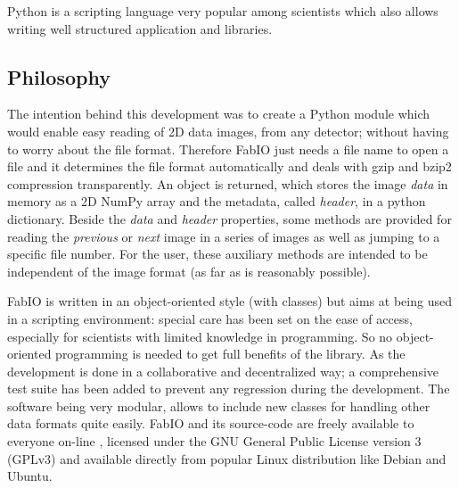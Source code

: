 \documentclass{iucr}
\begin{document}
Python \cite{python} is a scripting language very popular among scientists
which also allows writing well structured application and libraries.

\subsection{Philosophy}

The intention behind this development was to create a Python module which would
enable easy reading of 2D data images, from any detector; without having to
worry about the file format.
Therefore FabIO just needs a file name to open a file and it determines the
file format automatically and deals with gzip \cite{gzip} and bzip2
\cite{bzip2} compression transparently.
An object is returned, which stores the image
{\em data} in memory as a 2D NumPy array \cite{numpy} and the metadata,
called {\em header}, in a python dictionary. Beside the
{\em data} and {\em header} properties, some methods are provided for reading
the {\em previous} or {\em next} image in a series of images as well as jumping
to a specific file number.
For the user, these auxiliary methods are intended to be independent of
the image format (as far as is reasonably possible).

FabIO is written in an object-oriented style (with classes) but aims at being
used in a scripting environment: special care has been set on the ease of
access, especially for scientists with limited knowledge in programming. So
no object-oriented programming is needed to get full benefits of
the library. 
As the development is done in a collaborative and decentralized way; a
comprehensive test suite has been added to prevent any regression during the
development. The software being very modular, allows to include new
classes for handling other data formats quite easily.
FabIO and its source-code are freely available to everyone on-line \cite{fabio}, 
licensed under the GNU General Public License version 3 (GPLv3) and available
directly from popular Linux distribution like Debian and Ubuntu.
\end{document}
